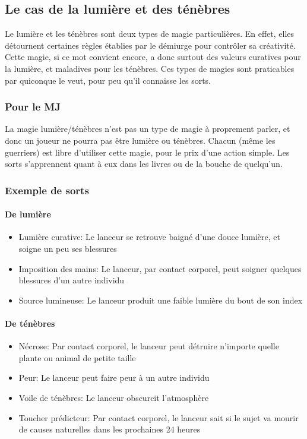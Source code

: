 \subsection{Le cas de la lumière et des ténèbres}
Le lumière et les ténèbres sont deux types de magie particulières. En effet, elles détournent certaines règles établies par le démiurge pour contrôler sa créativité. Cette magie, si ce mot convient encore, a donc surtout des valeurs curatives pour la lumière, et maladives pour les ténèbres. Ces types de magies sont praticables par quiconque le veut, pour peu qu'il connaisse les sorts.
\subsubsection{Pour le MJ}
La magie lumière/ténèbres n'est pas un type de magie à proprement parler, et donc un joueur ne pourra pas être lumière ou ténèbres. Chacun (même les guerriers) est libre d’utiliser cette magie, pour le prix d'une action simple.
Les sorts s’apprennent quant à eux dans les livres ou de la bouche de quelqu'un.
\subsubsection{Exemple de sorts}
\paragraph{De lumière}
\begin{itemize}
\item Lumière curative: Le lanceur se retrouve baigné d'une douce lumière, et soigne un peu ses blessures
\item Imposition des mains: Le lanceur, par contact corporel, peut soigner quelques blessures d'un autre individu
\item Source lumineuse: Le lanceur produit une faible lumière du bout de son index
\end{itemize}
\paragraph{De ténèbres}
\begin{itemize}
\item Nécrose: Par contact corporel, le lanceur peut détruire n'importe quelle plante ou animal de petite taille
\item Peur: Le lanceur peut faire peur à un autre individu
\item Voile de ténèbres: Le lanceur obscurcit l'atmosphère 
\item Toucher prédicteur: Par contact corporel, le lanceur sait si le sujet va mourir de causes naturelles dans les prochaines 24 heures
\end{itemize} 